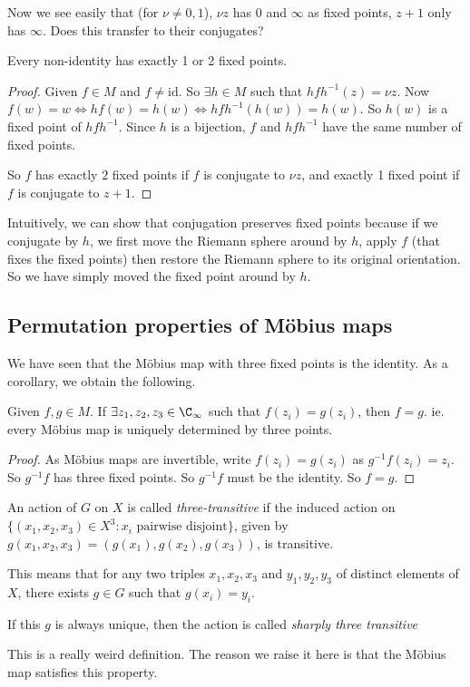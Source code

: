 \documentclass[a4paper]{article}
\begin{document}
Now we see easily that (for $\nu \not= 0, 1$), $\nu z$ has $0$ and $\infty$ as fixed points, $z + 1$ only has $\infty$. Does this transfer to their conjugates?

\begin{prop}
  Every non-identity has exactly 1 or 2 fixed points.
\end{prop}

\begin{proof}
  Given $f\in M$ and $f\not= \mathrm{id}$. So $\exists h\in M$ such that $hfh^{-1}(z) = \nu{z}$. Now $f(w) = w \Leftrightarrow hf(w) = h(w) \Leftrightarrow hfh^{-1}(h(w)) = h(w)$. So $h(w)$ is a fixed point of $hfh^{-1}$. Since $h$ is a bijection, $f$ and $hfh^{-1}$ have the same number of fixed points.

  So $f$ has exactly $2$ fixed points if $f$ is conjugate to $\nu z$, and exactly 1 fixed point if $f$ is conjugate to $z + 1$.
\end{proof}
Intuitively, we can show that conjugation preserves fixed points because if we conjugate by $h$, we first move the Riemann sphere around by $h$, apply $f$ (that fixes the fixed points) then restore the Riemann sphere to its original orientation. So we have simply moved the fixed point around by $h$.

\subsection{Permutation properties of M\"obius maps}
We have seen that the M\"obius map with three fixed points is the identity. As a corollary, we obtain the following.

\begin{prop}
  Given $f, g\in M$. If $\exists z_1, z_2, z_3\in \C_{\infty}$ such that $f(z_i) = g(z_i)$, then $f = g$. ie. every M\"obius map is uniquely determined by three points.
\end{prop}

\begin{proof}
  As M\"obius maps are invertible, write $f(z_i) = g(z_i)$ as $g^{-1}f(z_i) = z_i$. So $g^{-1}f$ has three fixed points. So $g^{-1}f$ must be the identity. So $f = g$.
\end{proof}

\begin{defi}
  An action of $G$ on $X$ is called \emph{three-transitive} if the induced action on $\{(x_1, x_2, x_3)\in X^3: x_i\text{ pairwise disjoint}\}$, given by $g(x_1, x_2, x_3) = (g(x_1), g(x_2), g(x_3))$, is transitive.

  This means that for any two triples $x_1, x_2, x_3$ and $y_1, y_2, y_3$ of distinct elements of $X$, there exists $g\in G$ such that $g(x_i) = y_i$.

  If this $g$ is always unique, then the action is called \emph{sharply three transitive}
\end{defi}
This is a really weird definition. The reason we raise it here is that the M\"obius map satisfies this property.
\end{document}
